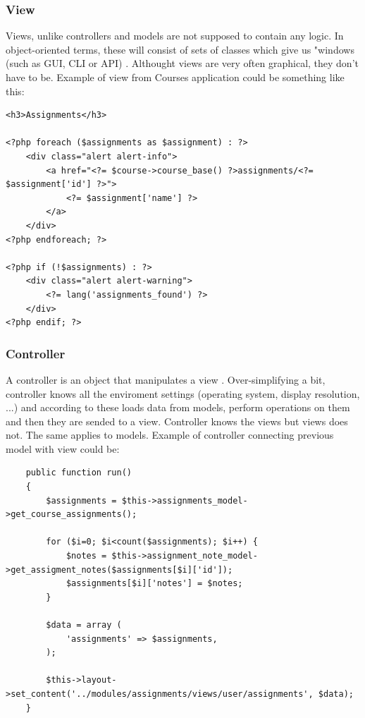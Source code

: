 \subsubsection{View}
Views, unlike controllers and models are not supposed to contain any logic. In object-oriented terms, these will consist of sets of classes which give us "windows (such as GUI, CLI or API) \cite{mvc}. Althought views are very often graphical, they don't have to be. Example of view from Courses application could be something like this:

\begin{lstlisting}
<h3>Assignments</h3>

<?php foreach ($assignments as $assignment) : ?>
    <div class="alert alert-info">
        <a href="<?= $course->course_base() ?>assignments/<?= $assignment['id'] ?>">
            <?= $assignment['name'] ?>
        </a>
    </div>
<?php endforeach; ?>

<?php if (!$assignments) : ?>
    <div class="alert alert-warning">
        <?= lang('assignments_found') ?>
    </div>
<?php endif; ?>
\end{lstlisting}

\subsubsection{Controller}
A controller is an object that manipulates a view \cite{mvc}. Over-simplifying a bit, controller knows all the enviroment settings (operating system, display resolution, ...) and according to these loads data from models, perform operations on them and then they are sended to a view. Controller knows the views but views does not. The same applies to models. Example of controller connecting previous model with view could be:

\begin{lstlisting}
    public function run()
    {
        $assignments = $this->assignments_model->get_course_assignments();

        for ($i=0; $i<count($assignments); $i++) {
            $notes = $this->assignment_note_model->get_assigment_notes($assignments[$i]['id']);
            $assignments[$i]['notes'] = $notes;
        }

        $data = array (
            'assignments' => $assignments,
        );

        $this->layout->set_content('../modules/assignments/views/user/assignments', $data);
    }
\end{lstlisting}

